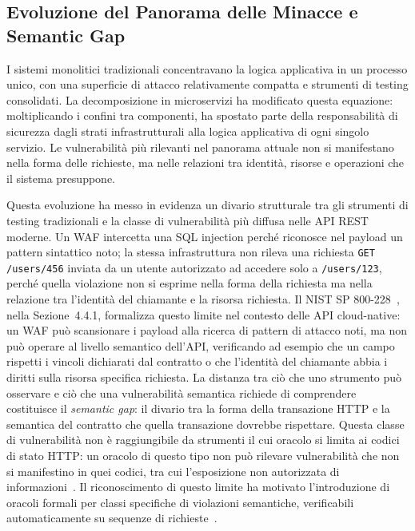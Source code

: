 \subsection{Evoluzione del Panorama delle Minacce e Semantic Gap}\label{subsec:semantic-gap}

I sistemi monolitici tradizionali concentravano la logica applicativa in un processo unico, con una superficie di attacco relativamente compatta e strumenti di testing consolidati. La decomposizione in microservizi ha modificato questa equazione: moltiplicando i confini tra componenti, ha spostato parte della responsabilità di sicurezza dagli strati infrastrutturali alla logica applicativa di ogni singolo servizio. Le vulnerabilità più rilevanti nel panorama attuale non si manifestano nella forma delle richieste, ma nelle relazioni tra identità, risorse e operazioni che il sistema presuppone.

Questa evoluzione ha messo in evidenza un divario strutturale tra gli strumenti di testing tradizionali e la classe di vulnerabilità più diffusa nelle \gls{API} REST moderne. Un \gls{WAF} intercetta una SQL injection perché riconosce nel payload un pattern sintattico noto; la stessa infrastruttura non rileva una richiesta \texttt{GET /users/456} inviata da un utente autorizzato ad accedere solo a \texttt{/users/123}, perché quella violazione non si esprime nella forma della richiesta ma nella relazione tra l'identità del chiamante e la risorsa richiesta. Il NIST SP 800-228~\cite{chandramouliGuidelinesAPIProtection2026}, nella Sezione~4.4.1, formalizza questo limite nel contesto delle API cloud-native: un WAF può scansionare i payload alla ricerca di pattern di attacco noti, ma non può operare al livello semantico dell'API, verificando ad esempio che un campo rispetti i vincoli dichiarati dal contratto o che l'identità del chiamante abbia i diritti sulla risorsa specifica richiesta.
La distanza tra ciò che uno strumento può osservare e ciò che una
vulnerabilità semantica richiede di comprendere costituisce il
\emph{semantic gap}: il divario tra la forma della transazione
\gls{HTTP} e la semantica del contratto che quella transazione
dovrebbe rispettare. Questa classe di vulnerabilità non è
raggiungibile da strumenti il cui oracolo si limita ai codici di
stato \gls{HTTP}: un oracolo di questo tipo non può rilevare
vulnerabilità che non si manifestino in quei codici, tra cui
l'esposizione non autorizzata di informazioni~\cite{atlidakisRESTlerStatefulREST2019a}. Il riconoscimento di questo limite ha motivato l'introduzione di oracoli formali per classi specifiche di violazioni semantiche, verificabili automaticamente su sequenze di richieste~\cite{atlidakisCheckingSecurityProperties2020}.


